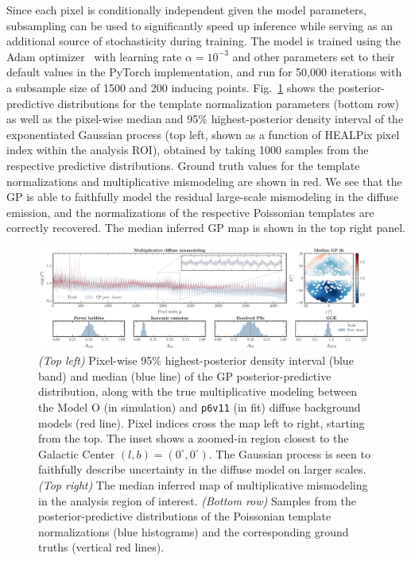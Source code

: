 \documentclass[]{article}
\begin{document}
Since each pixel is conditionally independent given the model parameters, subsampling can be used to significantly speed up inference while serving as an additional source of stochasticity during training. The model is trained using the Adam optimizer~\cite{DBLP:journals/corr/KingmaB14} with learning rate $\alpha=10^{-3}$ and other parameters set to their default values in the PyTorch implementation, and run for 50,000 iterations with a subsample size of 1500 and 200 inducing points.
Fig.~\ref{fig:experiment} shows the posterior-predictive distributions for the template normalization parameters (bottom row) as well as the pixel-wise median and 95\% highest-posterior density interval of the exponentiated Gaussian process (top left, shown as a function of HEALPix pixel index within the analysis ROI), obtained by taking 1000 samples from the respective predictive distributions. Ground truth values for the template normalizations and multiplicative mismodeling are shown in red. We see that the GP is able to faithfully model the residual large-scale mismodeling in the diffuse emission, and the normalizations of the respective Poissonian templates are correctly recovered. The median inferred GP map is shown in the top right panel.

\begin{figure}[!t]
  \centering
  \includegraphics[width=0.98\textwidth]{figures/inference}
  \caption{\emph{(Top left)} Pixel-wise 95\% highest-posterior density interval (blue band) and median (blue line) of the GP posterior-predictive distribution, along with the true multiplicative modeling between the Model O (in simulation) and \texttt{p6v11} (in fit) diffuse background models (red line). Pixel indices cross the map left to right, starting from the top. The inset shows a zoomed-in region closest to the Galactic Center $(l, b) = (0^\circ, 0^\circ)$. The Gaussian process is seen to faithfully describe uncertainty in the diffuse model on larger scales. \emph{(Top right)} The median inferred map of multiplicative mismodeling in the analysis region of interest. \emph{(Bottom row)} Samples from the posterior-predictive distributions of the Poissonian template normalizations (blue histograms) and the corresponding ground truths (vertical red lines).}
  \label{fig:experiment}
\end{figure}
  
\end{document}
